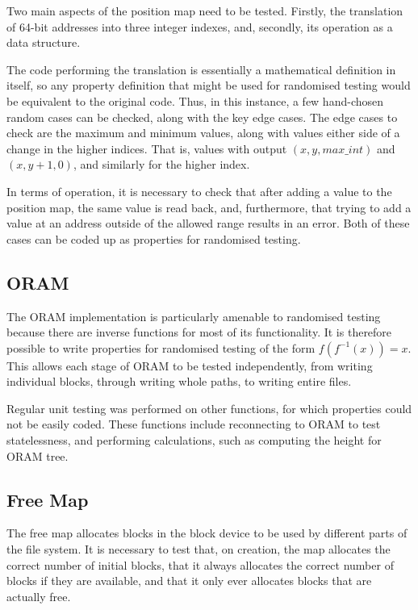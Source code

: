 \documentclass[12pt,a4paper,twoside,openright]{report}
\begin{document}
Two main aspects of the position map need to be tested. Firstly, the translation of 64-bit addresses into three integer indexes, and, secondly, its operation as a data structure.

The code performing the translation is essentially a mathematical definition in itself, so any property definition that might be used for randomised testing would be equivalent to the original code. Thus, in this instance, a few hand-chosen random cases can be checked, along with the key edge cases. The edge cases to check are the maximum and minimum values, along with values either side of a change in the higher indices. That is, values with output $(x,y,max\_int)$ and $(x,y+1,0)$, and similarly for the higher index.

In terms of operation, it is necessary to check that after adding a value to the position map, the same value is read back, and, furthermore, that trying to add a value at an address outside of the allowed range results in an error. Both of these cases can be coded up as properties for randomised testing.

\subsection{ORAM}

The ORAM implementation is particularly amenable to randomised testing because there are inverse functions for most of its functionality. It is therefore possible to write properties for randomised testing of the form $f(f^{-1}(x)) = x$. This allows each stage of ORAM to be tested independently, from writing individual blocks, through writing whole paths, to writing entire files.

Regular unit testing was performed on other functions, for which properties could not be easily coded. These functions include reconnecting to ORAM to test statelessness, and performing calculations, such as computing the height for ORAM tree.

\subsection{Free Map}

The free map allocates blocks in the block device to be used by different parts of the file system. It is necessary to test that, on creation, the map allocates the correct number of initial blocks, that it always allocates the correct number of blocks if they are available, and that it only ever allocates blocks that are actually free.
\end{document}
